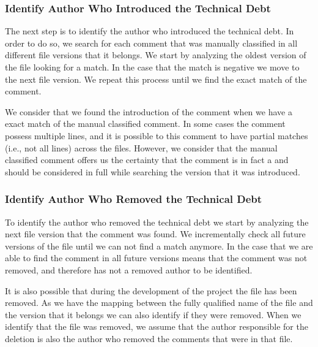 \subsubsection*{Identify Author Who Introduced the Technical Debt}
\label{subsub:identify_author_who_introduced_the_technical_debt}

The next step is to identify the author who introduced the technical debt. In order to do so, we search for each \SATD comment that was manually classified in all different file versions that it belongs. We start by analyzing the oldest version of the \SATD file looking for a match. In the case that the match is negative we move to the next \SATD file version. We repeat this process until we find the exact match of the \SATD comment. 

We consider that we found the introduction of the \SATD comment when we have a exact match of the manual classified \SATD comment. In some cases the \SATD comment possess multiple lines, and it is possible to this comment to have partial matches (i.e., not all lines) across the files. However, we consider that the manual classified \SATD comment offers us the certainty that the comment is in fact a \SATD and should be considered in full while searching the version that it was introduced.

\subsubsection*{Identify Author Who Removed the Technical Debt}
\label{subsub:identify_author_who_removed_the_technical_debt}

To identify the author who removed the technical debt we start by analyzing the next file version that the \SATD comment was found. We incrementally check all future versions of the file until we can not find a match anymore. In the case that we are able to find the \SATD comment in all future versions means that the \SATD comment was not removed, and therefore has not a removed author to be identified. 

It is also possible that during the development of the project the \SATD file has been removed. As we have the mapping between the fully qualified name of the file and the version that it belongs we can also identify if they were removed. When we identify that the file was removed, we assume that the author responsible for the deletion is also the author who removed the \SATD comments that were in that file.


